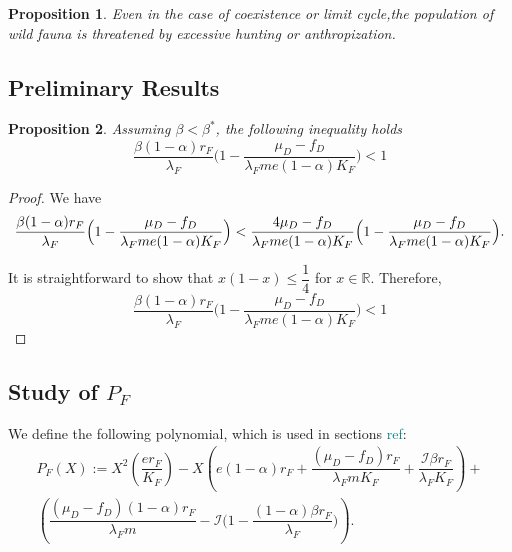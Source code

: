 \documentclass{article}
\newcommand{\lfw}{\lambda_{F}}
\newcommand{\lfw}{\lambda_{F}}
\newcommand{\cI}{\mathcal{I}}
\newcommand{\marc}[1]{\textcolor{teal}{#1}}
\newtheorem{prop}{Proposition}
\begin{document}
\begin{prop}
Even in the case of coexistence or limit cycle,the population of wild fauna is threatened by excessive hunting or anthropization. 
\end{prop}




\begin{appendix}
\section{Preliminary Results}
\begin{prop} \label{propBeta}
Assuming $\beta < \beta^*$, the following inequality holds
$$
\dfrac{\beta (1-\alpha) r_F}{\lfw} \Big(1 - \dfrac{\mu_D - f_D}{\lfw m e (1-\alpha) K_F}\Big) < 1
$$
\end{prop}

\begin{proof}
We have
\begin{equation*}
\dfrac{\beta (1-\alpha) r_F}{\lfw} \Big(1 - \dfrac{\mu_D - f_D}{\lfw m e (1-\alpha) K_F}\Big) < \dfrac{4 \mu_D - f_D}{\lfw m e (1-\alpha) K_F} \Big(1 - \dfrac{\mu_D - f_D}{\lfw m e (1-\alpha) K_F}\Big).\\
\end{equation*}

It is straightforward to show that $x(1 - x) \leq \dfrac{1}{4}$ for $x \in \mathbb{R}$. Therefore,
\begin{equation*}
\dfrac{\beta (1-\alpha) r_F}{\lfw} \Big(1 - \dfrac{\mu_D - f_D}{\lfw m e (1-\alpha) K_F}\Big) <  1
\end{equation*}
\end{proof}
\subsection{Study of $P_F$} \label{section:study of PF}
We define the following polynomial, which is used in sections \marc{ref}:
\begin{multline}
P_F(X) := X^2 \left(\dfrac{er_F}{K_F} \right) - X \left(e(1-\alpha)r_F + \dfrac{(\mu_D - f_D) r_F}{\lfw m K_F} + \dfrac{\cI \beta r_F}{\lfw K_F} \right) + \\ \left(\dfrac{(\mu_D - f_D)(1-\alpha) r_F}{\lfw m} - \cI\Big(1 - \dfrac{(1-\alpha)\beta r_F}{\lfw} \Big) \right).
\label{polynome-Feq}
\end{multline} 


\end{appendix}
\end{document}
